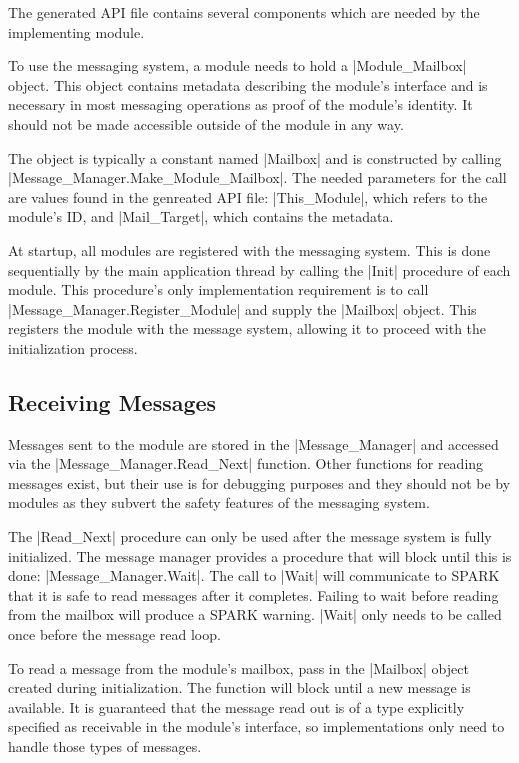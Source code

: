 The generated API file contains several components which are needed by the implementing module.

To use the messaging system, a module needs to hold a |Module_Mailbox| object. This object contains metadata describing the module's interface and is necessary in most messaging operations as proof of the module's identity. It should not be made accessible outside of the module in any way.

The object is typically a constant named |Mailbox| and is constructed by calling |Message_Manager.Make_Module_Mailbox|. The needed parameters for the call are values found in the genreated API file: |This_Module|, which refers to the module's ID, and |Mail_Target|, which contains the metadata.

At startup, all modules are registered with the messaging system. This is done sequentially by the main application thread by calling the |Init| procedure of each module. This procedure's only implementation requirement is to call |Message_Manager.Register_Module| and supply the |Mailbox| object. This registers the module with the message system, allowing it to proceed with the initialization process.

\subsection{Receiving Messages}

Messages sent to the module are stored in the |Message_Manager| and accessed via the |Message_Manager.Read_Next| function. Other functions for reading messages exist, but their use is for debugging purposes and they should not be by modules as they subvert the safety features of the messaging system.

The |Read_Next| procedure can only be used after the message system is fully initialized. The message manager provides a procedure that will block until this is done: |Message_Manager.Wait|. The call to |Wait| will communicate to SPARK that it is safe to read messages after it completes. Failing to wait before reading from the mailbox will produce a SPARK warning. |Wait| only needs to be called once before the message read loop.

To read a message from the module's mailbox, pass in the |Mailbox| object created during initialization. The function will block until a new message is available. It is guaranteed that the message read out is of a type explicitly specified as receivable in the module's interface, so implementations only need to handle those types of messages.

